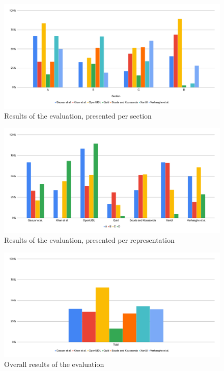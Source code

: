 \begin{figure}
    \centering
    \includegraphics[width=\textwidth]{4-results-and-discussion/results-per-section}
    \caption{Results of the evaluation, presented per section}
    \label{fig:4-1-results-per-section}
\end{figure}

\begin{figure}
    \centering
    \includegraphics[width=\textwidth]{4-results-and-discussion/results-per-representation}
    \caption{Results of the evaluation, presented per representation}
    \label{fig:4-1-results-per-representation}
\end{figure}

\begin{figure}
    \centering
    \includegraphics[width=\textwidth]{4-results-and-discussion/results-total}
    \caption{Overall results of the evaluation}
    \label{fig:4-1-results-total}
\end{figure}

